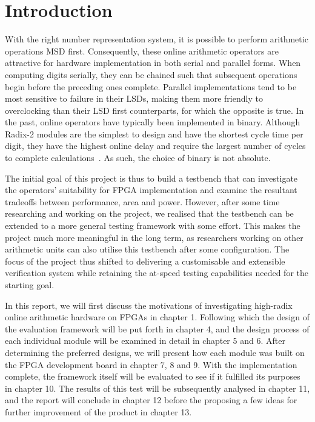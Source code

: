 \chapter{Introduction}

With the right number representation system, it is possible to perform arithmetic operations MSD first.
Consequently, these online arithmetic operators are attractive for hardware implementation in both serial and parallel forms.
When computing digits serially, they can be chained such that subsequent operations begin before the preceding ones complete.
Parallel implementations tend to be most sensitive to failure in their LSDs, making them more friendly to overclocking than their LSD first counterparts, for which the opposite is true.
In the past, online operators have typically been implemented in binary.
Although Radix-2 modules are the simplest to design and have the shortest cycle time per digit, they have the highest online delay and require the largest number of cycles to complete calculations~\cite{Tenca1}.
As such, the choice of binary is not absolute.

The initial goal of this project is thus to build a testbench that can investigate the operators' suitability for FPGA implementation and examine the resultant tradeoffs between performance, area and power.
However, after some time researching and working on the project, we realised that the testbench can be extended to a more general testing framework with some effort.
This makes the project much more meaningful in the long term, as researchers working on other arithmetic units can also utilise this testbench after some configuration.
The focus of the project thus shifted to delivering a customisable and extensible verification system while retaining the at-speed testing capabilities needed for the starting goal.

In this report, we will first discuss the motivations of investigating high-radix online arithmetic hardware on FPGAs in chapter 1.
Following which the design of the evaluation framework will be put forth in chapter 4, and the design process of each individual module will be examined in detail in chapter 5 and 6.
After determining the preferred designs, we will present how each module was built on the FPGA development board in chapter 7, 8 and 9.
With the implementation complete, the framework itself will be evaluated to see if it fulfilled its purposes in chapter 10.
The results of this test will be subsequently analysed in chapter 11, and the report will conclude in chapter 12 before the proposing a few ideas for further improvement of the product in chapter 13.
